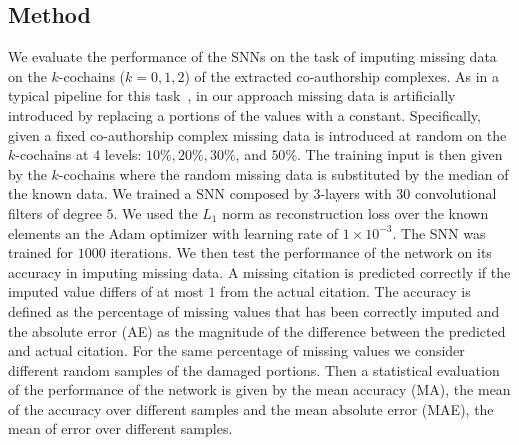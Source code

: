\subsection{Method}
We evaluate the performance of the SNNs on the task of imputing missing data on the $k$-cochains ($k=0,1,2$) of the extracted co-authorship complexes. As in a typical pipeline for this task~\cite{nelwamondo2007missing}, in our approach missing data is artificially introduced by replacing a portions of the values with a constant. Specifically, given a fixed co-authorship complex missing data is introduced at random on the $k$-cochains at $4$ levels: $10\%,  20\%,  30\%$, and $50\% $. The training input is then given by the $k$-cochains where the random missing data is substituted by the median of the known data. We trained a SNN composed by $3$-layers with $30$ convolutional filters of degree $5$. We used the $L_1$ norm as reconstruction loss over the known elements an the Adam optimizer with learning rate of $1\times 10^{-3}$. The SNN was trained for $1000$ iterations. We then test the performance of the network on its accuracy in imputing missing data. A missing citation is predicted correctly if the imputed value differs of at most $1$ from the actual citation. The accuracy is defined as the percentage of missing values that has been correctly imputed and the absolute error (AE) as the magnitude of the difference between the predicted and actual citation. For the same percentage of missing values we consider different random samples of the damaged portions. Then a statistical evaluation of the performance of the network is given by the mean accuracy (MA), the mean of the accuracy over different samples and the mean absolute error (MAE), the mean of error over different samples.


